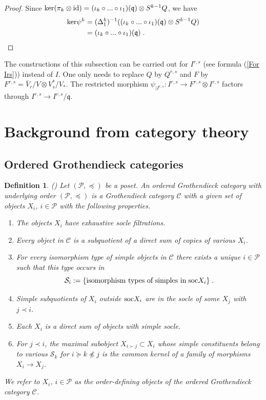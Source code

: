 \documentclass[12pt]{article}
\def\mc {\mathcal}
\def\mk {\mathfrak}
\newtheorem{definition}{Definition}[section]
\begin{document}
\begin{proof}
Since ${\rm ker}(\pi_k\otimes{\rm id})=(\iota_k\circ...\circ \iota_1)(\mk q)\otimes S^{k-1} Q$, we have
\begin{align*}
{\rm ker}\psi^k & = (\Delta^k_1)^{-1}((\iota_k\circ...\circ \iota_1)(\mk q)\otimes S^{k-1} Q) \\
                  & = (\iota_k\circ...\circ \iota_1)(\mk q) \;.
\end{align*}
\end{proof}


The constructions of this subsection can be carried out for $I^{r,s}$ (see formula (\ref{For Irs})) instead of $I$. One only needs to replace $Q$ by $Q^{r,s}$ and $F$ by $F^{r,s}=\bar V_{r}/V \otimes V^*_{s}/V_*$. The restricted morphism $\psi_{\vert I^{r,s}}:I^{r,s}\to F^{r,s} \otimes I^{r,s}$ factors through $I^{r,s}\to I^{r,s}/\mk q$.



\section{Background from category theory}


\subsection{Ordered Grothendieck categories}


\begin{definition}\label{Def OrdGrothCat} (\cite[Def.~2.3]{Chirvasitu-Penkov-UTC})
Let $(\mc P,\preceq)$ be a poset. An {\rm ordered Grothendieck category with underlying order} $(\mc P,\preceq)$ is a Grothendieck category $\mc C$ with a given set of objects $X_i$, $i\in\mc P$ with the following properties.

\begin{enumerate}
\item[(a)] The objects $X_i$ have exhaustive socle filtrations.
\item[(b)] Every object in $\mc C$ is a subquotient of a direct sum of copies of various $X_i$.
\item[(c)] For every isomorphism type of simple objects in $\mc C$ there exists a unique $i\in\mc P$ such that this type occurs in
$$\mc S_i:=\{\textrm{isomorphism types of simples in}\;{\rm soc}X_i\}\;.$$
\item[(d)] Simple subquotients of $X_i$ outside ${\rm soc}X_i$ are in the socle of some $X_j$ with $j\prec i$.
\item[(e)] Each $X_i$ is a direct sum of objects with simple socle.
\item[(f)] For $j\prec i$, the maximal subobject $X_{i\succ j}\subset X_i$ whose simple constituents belong to various $\mc S_k$ for $i\succeq k\npreceq j$ is the common kernel of a family of morphisms $X_i\to X_j$.
\end{enumerate}
We refer to $X_i$, $i\in\mc P$ as the order-defining objects of the ordered Grothendieck category $\mc C$.
\end{definition}
\end{document}

